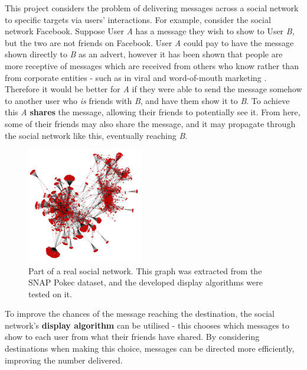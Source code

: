 \documentclass[bsc,frontabs,twoside,singlespacing,parskip,deptreport]{infthesis}     %
\begin{document}
This project considers the problem of delivering messages across a social network to specific targets via users' interactions. For example, consider the social network Facebook. Suppose User \textit{A} has a message they wish to show to User \textit{B}, but the two are not friends on Facebook. User \textit{A} could pay to have the message shown directly to \textit{B} as an advert, however it has been shown that people are more receptive of messages which are received from others who know rather than from corporate entities - such as in viral and word-of-mouth marketing \cite{viralmarketing, wordofmouth}. Therefore it would be better for \textit{A} if they were able to send the message somehow to another user who \textit{is} friends with \textit{B}, and have them show it to \textit{B}. To achieve this \textit{A} \textbf{shares} the message, allowing their friends to potentially see it. From here, some of their friends may also share the message, and it may propagate through the social network like this, eventually reaching \textit{B}.

\begin{figure}
\centering
\includegraphics[width=0.45\textwidth]{pokec_4000}
\caption{Part of a real social network. This graph was extracted from the SNAP Pokec dataset\cite{snapnets}, and the developed display algorithms were tested on it.}
\label{fig:pokec_4000_intro}
\end{figure}

To improve the chances of the message reaching the destination, the social network's \textbf{display algorithm} can be utilised - this chooses which messages to show to each user from what their friends have shared. By considering destinations when making this choice, messages can be directed more efficiently, improving the number delivered.
\end{document}
